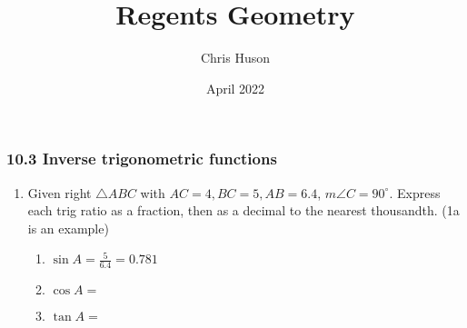 \documentclass[12pt, twoside]{article}
\title{Regents Geometry}
\author{Chris Huson}
\date{April 2022}
\begin{document}
\subsubsection*{10.3 Inverse trigonometric functions}
\begin{enumerate}
\item Given right $\triangle ABC$ with $AC=4, BC=5, AB=6.4$, $m\angle C=90^\circ$. Express each trig ratio as a fraction, then as a decimal to the nearest thousandth. (1a is an example)
  \begin{multicols}{2}
    \begin{enumerate}[itemsep=0.2cm]
      \item $\displaystyle \sin A = \frac{5}{6.4} = 0.781$
      \item $\cos A =$
      \item $\tan A =$
    \end{enumerate}
    \begin{center}
    \end{center}
  \end{multicols} \vspace{1cm}


\end{enumerate}
\end{document}

